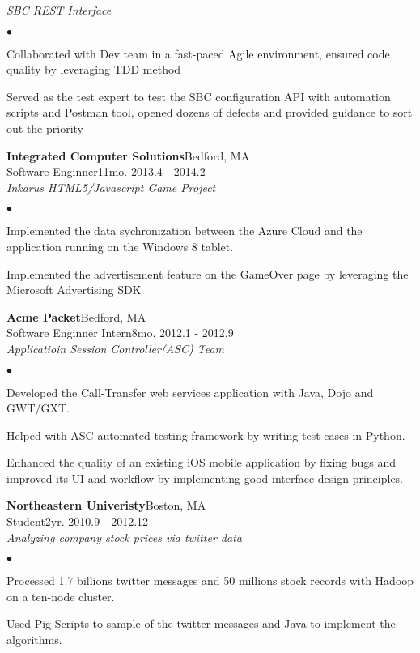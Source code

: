 \documentclass[10pt]{article}
\newcommand{\company}[5]{
    \large{\textbf{#1}}\hfill \small{#3}\\
    #2\hfill \small{#4}\small{#5}\\
}
\newcommand{\project}[1]{\checkmark\normalsize{{\emph{#1}}}\\}
\newenvironment{achievements}
    {\begin{list}
        {$\bullet$}{\topsep 0pt \itemsep -1pt}} 
    {\end{list}}
\begin{document}
  \project{SBC REST Interface}
  \begin{achievements}
\item Collaborated with Dev team in a fast-paced Agile environment, ensured code quality by leveraging TDD method
\item Served as the test expert to test the SBC configuration API with automation scripts and Postman tool, opened dozens of defects and provided guidance to sort out the priority
  \end{achievements}

  \company{Integrated Computer Solutions}{Software Enginner}{Bedford, MA}{11mo. }{2013.4 - 2014.2}

    \project{Inkarus HTML5/Javascript Game Project}
  \begin{achievements}
\item Implemented the data sychronization between the Azure Cloud and the application running on the Windows 8 tablet.
\item Implemented the advertisement feature on the GameOver page by leveraging the Microsoft Advertising SDK
  \end{achievements}

\vspace*{10pt}
  \company{Acme Packet}{Software Enginner Intern}{Bedford, MA}{8mo. }{2012.1 - 2012.9}

  \project{Applicatioin Session Controller(ASC) Team}
  \begin{achievements}
\item Developed the Call-Transfer web services application with Java, Dojo and GWT/GXT.
\item Helped with ASC automated testing framework by writing test cases in Python.
\item Enhanced the quality of an existing iOS mobile application by fixing bugs and improved its UI and workflow by implementing good interface design principles.
  \end{achievements}

\vspace*{10pt}
  \company{Northeastern Univeristy}{Student}{Boston, MA}{2yr. }{2010.9 - 2012.12}

  \project{Analyzing company stock prices via twitter data}
  \begin{achievements}
\item Processed 1.7 billions twitter messages and 50 millions stock records with Hadoop on a ten-node cluster.
\item Used Pig Scripts to sample of the twitter messages and Java to implement the algorithms.
  \end{achievements}
\end{document}

